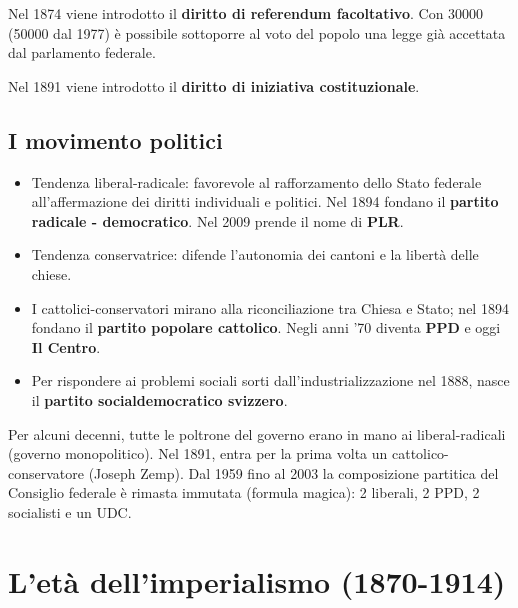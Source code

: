 \documentclass[a4paper]{article}
\begin{document}
Nel 1874 viene introdotto il \textbf{diritto di referendum facoltativo}.
Con 30000 (50000 dal 1977) è possibile sottoporre al voto del popolo una legge già accettata dal parlamento federale.

Nel 1891 viene introdotto il \textbf{diritto di iniziativa costituzionale}.

\subsection{I movimento politici}

\begin{itemize}
    \item Tendenza liberal-radicale: favorevole al rafforzamento dello Stato federale all'affermazione dei diritti individuali e politici.
    Nel 1894 fondano il \textbf{partito radicale - democratico}.
    Nel 2009 prende il nome di \textbf{PLR}.
    \item Tendenza conservatrice: difende l'autonomia dei cantoni e la libertà delle chiese.
    \item I cattolici-conservatori mirano alla riconciliazione tra Chiesa e Stato; nel 1894 fondano il \textbf{partito popolare cattolico}.
    Negli anni '70 diventa \textbf{PPD} e oggi \textbf{Il Centro}.
    \item Per rispondere ai problemi sociali sorti dall'industrializzazione nel 1888, nasce il \textbf{partito socialdemocratico svizzero}.
\end{itemize}

Per alcuni decenni, tutte le poltrone del governo erano in mano ai liberal-radicali (governo monopolitico).
Nel 1891, entra per la prima volta un cattolico-conservatore (Joseph Zemp).
Dal 1959 fino al 2003 la composizione partitica del Consiglio federale è rimasta immutata (formula magica):
2 liberali, 2 PPD, 2 socialisti e un UDC.

\pagebreak

\section{L'età dell'imperialismo (1870-1914)} %


    
\end{document}
